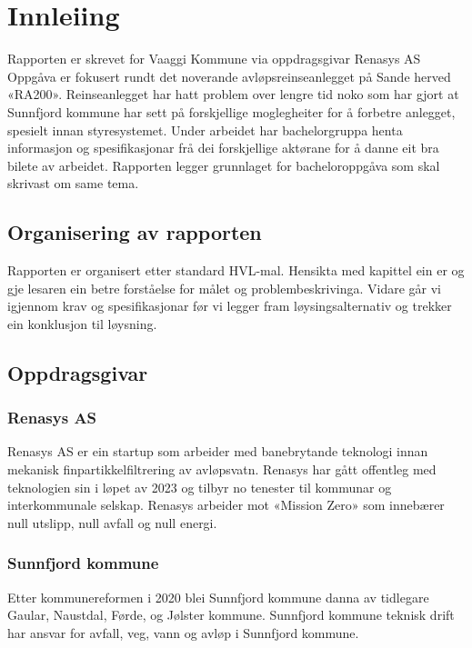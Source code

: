\chapter{Innleiing}
\thispagestyle{fancy}
Rapporten er skrevet for Vaaggi Kommune via oppdragsgivar Renasys AS
Oppgåva er fokusert rundt det noverande avløpsreinseanlegget på Sande herved «RA200». Reinseanlegget har hatt problem over lengre tid noko som har gjort at Sunnfjord kommune har sett på forskjellige moglegheiter for å forbetre anlegget, spesielt innan styresystemet.
Under arbeidet har bachelorgruppa henta informasjon og spesifikasjonar frå dei forskjellige aktørane for å danne eit bra bilete av arbeidet. Rapporten legger grunnlaget for bacheloroppgåva som skal skrivast om same tema.

\newpage
\section{Organisering av rapporten}
Rapporten er organisert etter standard HVL-mal.
Hensikta med kapittel ein er og gje lesaren ein betre forståelse for målet og problembeskrivinga. 
Vidare går vi igjennom krav og spesifikasjonar før vi legger fram løysingsalternativ og trekker ein konklusjon til løysning.

\section{Oppdragsgivar}

\subsection{Renasys AS}
Renasys AS er ein startup som arbeider med banebrytande teknologi innan mekanisk finpartikkelfiltrering av avløpsvatn. 
Renasys har gått offentleg med teknologien sin i løpet av 2023 og tilbyr no tenester til kommunar og interkommunale selskap. 
Renasys arbeider mot «Mission Zero» som innebærer null utslipp, null avfall og null energi.

\subsection{Sunnfjord kommune}
Etter kommunereformen i 2020 blei Sunnfjord kommune danna av tidlegare Gaular, Naustdal, Førde, og Jølster kommune. Sunnfjord kommune teknisk drift har ansvar for avfall, veg, vann og avløp i Sunnfjord kommune.